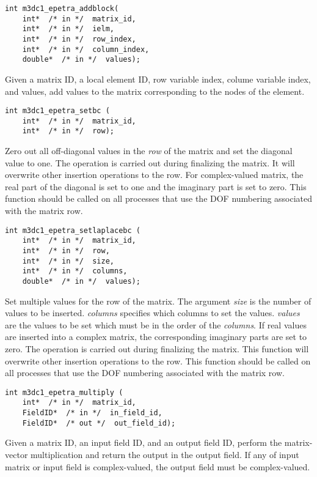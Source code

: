 \begin{verbatim}
int m3dc1_epetra_addblock(
    int*  /* in */  matrix_id,
    int*  /* in */  ielm, 
    int*  /* in */  row_index, 
    int*  /* in */  column_index, 
    double*  /* in */  values);
\end{verbatim}\vspace{-.5cm}\hspace{1cm}
Given a matrix ID, a local element ID, row variable index, colume variable index, and values, add values to the matrix corresponding to the nodes of the element. 

\begin{verbatim}
int m3dc1_epetra_setbc (
    int*  /* in */  matrix_id, 
    int*  /* in */  row);
\end{verbatim}\vspace{-.5cm}\hspace{1cm}
Zero out all off-diagonal values in the \textit{row} of the matrix and set the diagonal value to one. The operation is carried out during finalizing the matrix. It will overwrite other insertion operations to the row. For complex-valued matrix, the real part of the diagonal is set to one and the imaginary part is set to zero.
This function should be called on all processes that use the DOF numbering associated with the matrix row. 

\begin{verbatim}
int m3dc1_epetra_setlaplacebc (
    int*  /* in */  matrix_id, 
    int*  /* in */  row, 
    int*  /* in */  size, 
    int*  /* in */  columns, 
    double*  /* in */  values);
\end{verbatim}\vspace{-.5cm}\hspace{1cm}
Set multiple values for the row of the matrix. The argument \textit{size} is the  number of values to be inserted. \textit{columns} specifies which columns to set the values. \textit{values} are the values to be set which must be in the order of the \textit{columns}. If real values are inserted into a complex matrix, the corresponding imaginary parts are set to zero. The operation is carried out during finalizing the matrix. This function will overwrite other insertion operations to the row. This function should be called on all processes that use the DOF numbering associated with the matrix row. 

\begin{verbatim}
int m3dc1_epetra_multiply (
    int*  /* in */  matrix_id, 
    FieldID*  /* in */  in_field_id, 
    FieldID*  /* out */  out_field_id); 
\end{verbatim}\vspace{-.5cm}\hspace{1cm}
Given a matrix ID, an input field ID, and an output field ID, perform the matrix-vector multiplication and return the output in the output field.
If any of input matrix or input field is complex-valued, the output field must be complex-valued.

